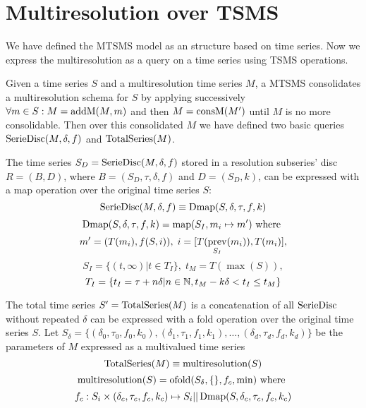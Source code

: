 










\section{Multiresolution over TSMS}

We have defined the MTSMS model as an structure based on time
series. Now we express the multiresolution as a query on a time series
using TSMS operations. 

Given a time series $S$ and a multiresolution time series $M$, a MTSMS
consolidates a multiresolution schema for $S$ by applying successively
$\forall m \in S: M=\operatorname{addM}(M,m)$ and then $M=\operatorname{consM}(M')$ until $M$ is
no more consolidable. Then over this consolidated $M$ we have defined
two basic queries $\operatorname{SerieDisc}(M,\delta,f)$ and $\operatorname{TotalSeries}(M)$.

The time series $S_D=\operatorname{SerieDisc}(M,\delta,f)$ stored in a resolution
subseries' disc $R=(B,D)$, where $B=(S_D,\tau,\delta,f)$ and
$D=(S_D,k)$, can be expressed with a map operation over the original
time series $S$:
\[
\operatorname{SerieDisc}(M,\delta,f) \equiv \operatorname{Dmap}(S,\delta,\tau,f,k)
\]
\[
\operatorname{Dmap}(S,\delta,\tau,f,k) = \operatorname*{map}(S_I, m_i\mapsto m') \text{ where }
\]
\[
 m' = (T(m_i), f(S, i)),\;  i = [T(\operatorname*{prev}_{S_I}(m_i)),T(m_i)],
\]
\[
 S_I = \{ (t,\infty) | t\in T_I  \},\;  t_M = T(\max(S)),
\]
\[
T_I = \{ t_I = \tau+n\delta | n\in\mathbb{N}, t_M - k\delta < t_I \leq t_M \}
\]


The total time series $S'=\operatorname{TotalSeries}(M)$ is a concatenation of all
$\operatorname{SerieDisc}$ without repeated $\delta$ can be expressed with a fold
operation over the original time series $S$. Let $S_\delta = \{
(\delta_0,\tau_0,f_0,k_0), (\delta_1,\tau_1,f_1,k_1), \ldots,
(\delta_d,\tau_d,f_d,k_d)\}$ be the parameters of $M$ expressed as a
multivalued time series 
\[
\operatorname{TotalSeries}(M) \equiv \operatorname{multiresolution}(S)
\]
\[
\operatorname{multiresolution}(S) = \operatorname*{ofold}(S_\delta,\{\},f_c,\min) \text{ where }
\]
\[
f_c: S_i \times (\delta_c,\tau_c,f_c,k_c) \mapsto S_i ||
\operatorname{Dmap}(S,\delta_c,\tau_c,f_c,k_c)
\]



